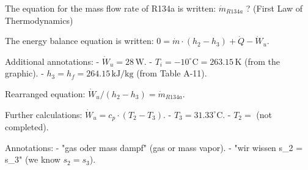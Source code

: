 The equation for the mass flow rate of R134a is written:  
\( \dot{m}_{R134a} \) ? (First Law of Thermodynamics)  

The energy balance equation is written:  
\( 0 = \dot{m} \cdot (h_2 - h_3) + \dot{Q} - \dot{W}_u \).  

Additional annotations:  
- \( \dot{W}_u = 28 \, \text{W} \).  
- \( T_i = -10^\circ \text{C} = 263.15 \, \text{K} \) (from the graphic).  
- \( h_3 = h_f = 264.15 \, \text{kJ/kg} \) (from Table A-11).  

Rearranged equation:  
\( \dot{W}_u / (h_2 - h_3) = \dot{m}_{R134a} \).  

Further calculations:  
\( \dot{W}_u = c_p \cdot (T_2 - T_3) \).  
- \( T_3 = 31.33^\circ \text{C} \).  
- \( T_2 = \) (not completed).  

Annotations:  
- "gas oder mass dampf" (gas or mass vapor).  
- "wir wissen s_2 = s_3" (we know \( s_2 = s_3 \)).